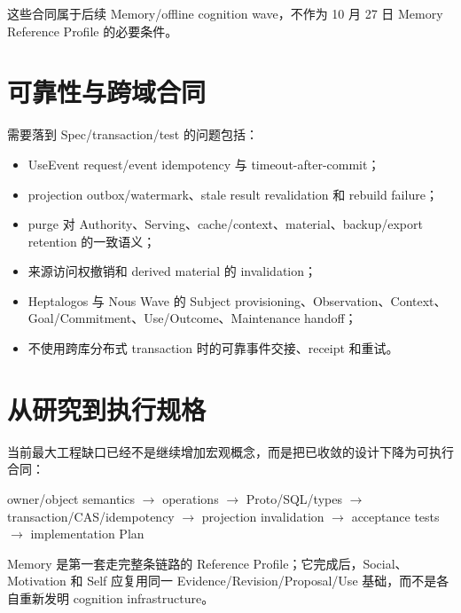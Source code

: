 这些合同属于后续 Memory/offline cognition wave，不作为 10 月 27 日 Memory Reference Profile 的必要条件。

\section{可靠性与跨域合同}

需要落到 Spec/transaction/test 的问题包括：

\begin{itemize}
\item UseEvent request/event idempotency 与 timeout-after-commit；
\item projection outbox/watermark、stale result revalidation 和 rebuild failure；
\item purge 对 Authority、Serving、cache/context、material、backup/export retention 的一致语义；
\item 来源访问权撤销和 derived material 的 invalidation；
\item Heptalogos 与 Nous Wave 的 Subject provisioning、Observation、Context、Goal/Commitment、Use/Outcome、Maintenance handoff；
\item 不使用跨库分布式 transaction 时的可靠事件交接、receipt 和重试。
\end{itemize}

\section{从研究到执行规格}

当前最大工程缺口已经不是继续增加宏观概念，而是把已收敛的设计下降为可执行合同：

\begin{center}
owner/object semantics $\rightarrow$ operations $\rightarrow$ Proto/SQL/types $\rightarrow$ transaction/CAS/idempotency $\rightarrow$ projection invalidation $\rightarrow$ acceptance tests $\rightarrow$ implementation Plan
\end{center}

Memory 是第一套走完整条链路的 Reference Profile；它完成后，Social、Motivation 和 Self 应复用同一 Evidence/Revision/Proposal/Use 基础，而不是各自重新发明 cognition infrastructure。